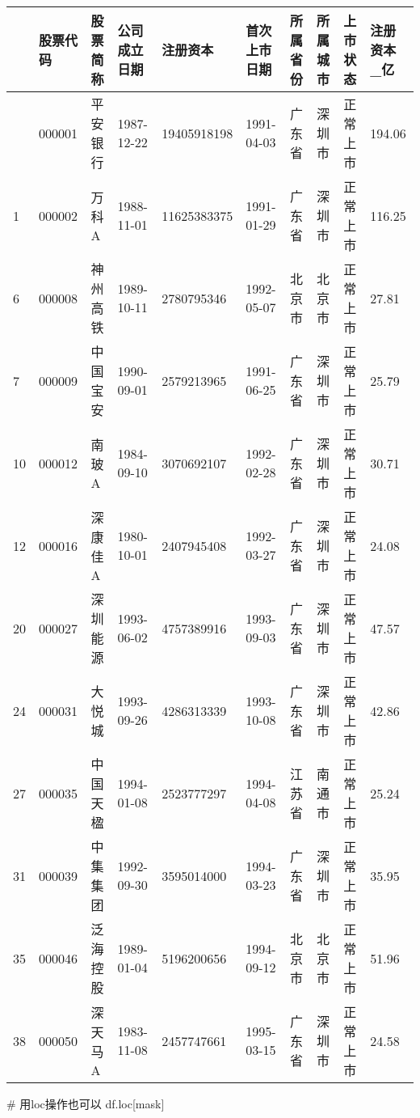 \documentclass[
  letterpaper,
  DIV=11,
  numbers=noendperiod]{scrreprt}
\newenvironment{Shaded}{\begin{snugshade}}{\end{snugshade}}
\newcommand{\CommentTok}[1]{\textcolor[rgb]{0.37,0.37,0.37}{#1}}
\newcommand{\NormalTok}[1]{\textcolor[rgb]{0.00,0.23,0.31}{#1}}
\begin{document}
\begin{longtable}[]{@{}llllllllll@{}}
\toprule\noalign{}
& 股票代码 & 股票简称 & 公司成立日期 & 注册资本 & 首次上市日期 &
所属省份 & 所属城市 & 上市状态 & 注册资本\_亿 \\
\midrule\noalign{}
\endhead
\bottomrule\noalign{}
\endlastfoot
0 & 000001 & 平安银行 & 1987-12-22 & 19405918198 & 1991-04-03 & 广东省 &
深圳市 & 正常上市 & 194.06 \\
1 & 000002 & 万科A & 1988-11-01 & 11625383375 & 1991-01-29 & 广东省 &
深圳市 & 正常上市 & 116.25 \\
6 & 000008 & 神州高铁 & 1989-10-11 & 2780795346 & 1992-05-07 & 北京市 &
北京市 & 正常上市 & 27.81 \\
7 & 000009 & 中国宝安 & 1990-09-01 & 2579213965 & 1991-06-25 & 广东省 &
深圳市 & 正常上市 & 25.79 \\
10 & 000012 & 南玻A & 1984-09-10 & 3070692107 & 1992-02-28 & 广东省 &
深圳市 & 正常上市 & 30.71 \\
12 & 000016 & 深康佳A & 1980-10-01 & 2407945408 & 1992-03-27 & 广东省 &
深圳市 & 正常上市 & 24.08 \\
20 & 000027 & 深圳能源 & 1993-06-02 & 4757389916 & 1993-09-03 & 广东省 &
深圳市 & 正常上市 & 47.57 \\
24 & 000031 & 大悦城 & 1993-09-26 & 4286313339 & 1993-10-08 & 广东省 &
深圳市 & 正常上市 & 42.86 \\
27 & 000035 & 中国天楹 & 1994-01-08 & 2523777297 & 1994-04-08 & 江苏省 &
南通市 & 正常上市 & 25.24 \\
31 & 000039 & 中集集团 & 1992-09-30 & 3595014000 & 1994-03-23 & 广东省 &
深圳市 & 正常上市 & 35.95 \\
35 & 000046 & 泛海控股 & 1989-01-04 & 5196200656 & 1994-09-12 & 北京市 &
北京市 & 正常上市 & 51.96 \\
38 & 000050 & 深天马A & 1983-11-08 & 2457747661 & 1995-03-15 & 广东省 &
深圳市 & 正常上市 & 24.58 \\
\end{longtable}

\begin{Shaded}
\begin{Highlighting}[]
\CommentTok{\# 用loc操作也可以}
\NormalTok{df.loc[mask]}
\end{Highlighting}
\end{Shaded}
\end{document}

